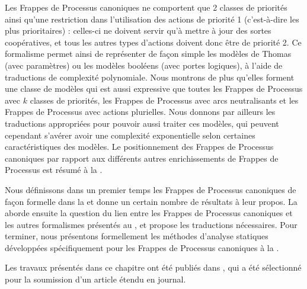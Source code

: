 Les Frappes de Processus canoniques
ne comportent que 2 classes de priorités ainsi qu'une restriction dans
l'utilisation des actions de priorité 1 (c'est-à-dire les plus prioritaires) :
celles-ci ne doivent servir qu'à mettre à jour des sortes coopératives,
et tous les autres types d'actions doivent donc être de priorité 2.
Ce formalisme permet ainsi de représenter de façon simple les modèles de Thomas (avec paramètres)
ou les modèles booléens (avec portes logiques),
à l'aide de traductions de complexité polynomiale.
Nous montrons de plus qu'elles forment une classe de modèles qui est aussi expressive
que toutes les Frappes de Processus avec $k$ classes de priorités,
les Frappes de Processus avec arcs neutralisants
et les Frappes de Processus avec actions plurielles.
Nous donnons par ailleurs les traductions appropriées pour pouvoir aussi traiter ces modèles,
qui peuvent cependant s'avérer avoir une complexité exponentielle
selon certaines caractéristiques des modèles.
Le positionnement des Frappes de Processus canoniques par rapport aux différents autres
enrichissements de Frappes de Processus est résumé à la .

\myskip

Nous définissons dans un premier temps les Frappes de Processus canoniques
de façon formelle dans la 
et donne un certain nombre de résultats à leur propos.
La  aborde ensuite
la question du lien entre les Frappes de Processus canoniques
et les autres formalismes présentés au ,
et propose les traductions nécessaires.
Pour terminer, nous présentons formellement
les méthodes d'analyse statiques développées spécifiquement
pour les Frappes de Processus canoniques à la .

Les travaux présentés dans ce chapitre ont été publiés dans
\cite*{FPMR13-CS2Bio},
qui a été sélectionné pour la soumission d'un article étendu en journal.



% 






